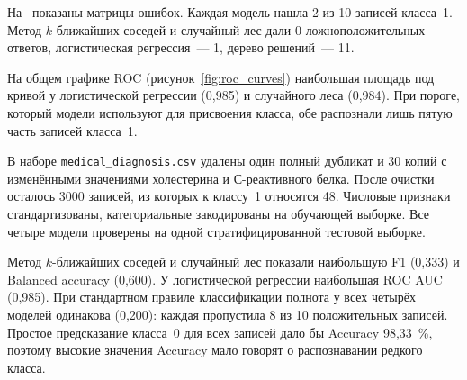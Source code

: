 \documentclass[a4paper,14pt]{extarticle}
\begin{document}

На~ показаны матрицы ошибок. Каждая модель нашла 2 из 10 записей класса~1. Метод $k$-ближайших соседей и случайный лес дали 0 ложноположительных ответов, логистическая регрессия~--- 1, дерево решений~--- 11.


На общем графике ROC (рисунок~\ref{fig:roc_curves}) наибольшая площадь под кривой у логистической регрессии (0,985) и случайного леса (0,984). При пороге, который модели используют для присвоения класса, обе распознали лишь пятую часть записей класса~1.


\suaiconclusion

В наборе \texttt{medical\_diagnosis.csv} удалены один полный дубликат и 30 копий с изменёнными значениями холестерина и С-реактивного белка. После очистки осталось 3000 записей, из которых к классу~1 относятся 48. Числовые признаки стандартизованы, категориальные закодированы на обучающей выборке. Все четыре модели проверены на одной стратифицированной тестовой выборке.

Метод $k$-ближайших соседей и случайный лес показали наибольшую F1 (0,333) и Balanced accuracy (0,600). У логистической регрессии наибольшая ROC AUC (0,985). При стандартном правиле классификации полнота у всех четырёх моделей одинакова (0,200): каждая пропустила 8 из 10 положительных записей. Простое предсказание класса~0 для всех записей дало бы Accuracy 98,33~\%, поэтому высокие значения Accuracy мало говорят о распознавании редкого класса.
\end{document}
